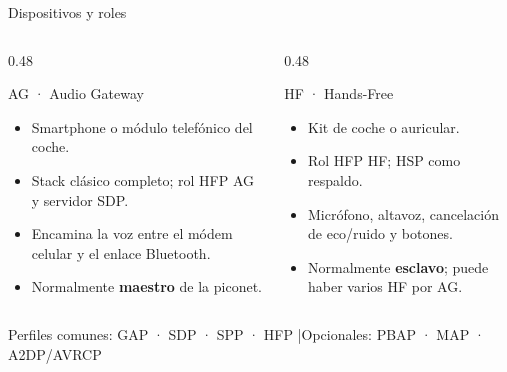 \documentclass[aspectratio=169,10pt]{beamer}
\begin{document}
\begin{frame}{Dispositivos y roles}
  \begin{columns}[T,onlytextwidth]
    \begin{column}{0.48\textwidth}
      \begin{block}{AG · Audio Gateway}
        \footnotesize
        \begin{itemize}
          \item Smartphone o módulo telefónico del coche.
          \item Stack clásico completo; rol HFP AG y servidor SDP.
          \item Encamina la voz entre el módem celular y el enlace Bluetooth.
          \item Normalmente \textbf{maestro} de la piconet.
        \end{itemize}
      \end{block}
    \end{column}
    \begin{column}{0.48\textwidth}
      \begin{block}{HF · Hands-Free}
        \footnotesize
        \begin{itemize}
          \item Kit de coche o auricular.
          \item Rol HFP HF; HSP como respaldo.
          \item Micrófono, altavoz, cancelación de eco/ruido y botones.
          \item Normalmente \textbf{esclavo}; puede haber varios HF por AG.
        \end{itemize}
      \end{block}
    \end{column}
  \end{columns}
  \vspace{2mm}
  \begin{center}
    \footnotesize Perfiles comunes: GAP · SDP · SPP · HFP \quad|\quad Opcionales: PBAP · MAP · A2DP/AVRCP
  \end{center}
\end{frame}
\end{document}
